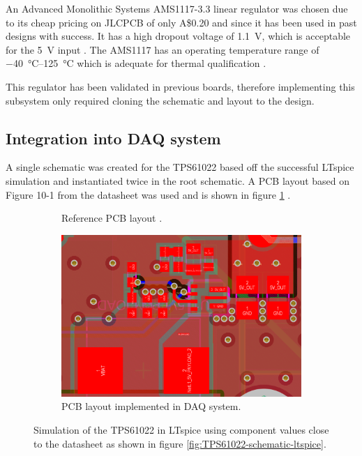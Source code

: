 \documentclass{report}
\newcommand{\aud}{A\$}
\begin{document}
An Advanced Monolithic Systems AMS1117-3.3 linear regulator was chosen due to its cheap pricing on JLCPCB of only \aud 0.20 and since it has been used in past designs with success. It has a high dropout voltage of \SI{1.1}{\volt}, which is acceptable for the \SI{5}{\volt} input \cite{ams2007ams1117}. The AMS1117 has an operating temperature range of \SIrange{-40}{125}{\degreeCelsius} which is adequate for thermal qualification \cite{ams2007ams1117}.

This regulator has been validated in previous boards, therefore implementing this subsystem only required cloning the schematic and layout to the design.

\subsection{Integration into DAQ system}

A single schematic was created for the TPS61022 based off the successful LTspice simulation and instantiated twice in the root schematic. A PCB layout based on Figure 10-1 from the datasheet was used and is shown in figure \ref{fig:TPS61022-layout} \cite{ti2021tps61022}.

\begin{figure}[H]
  \begin{subfigure}{.5\textwidth}
    \centering
    
    \caption{Reference PCB layout \cite{ti2021tps61022}.}
  \end{subfigure}
  \begin{subfigure}{.5\textwidth}
    \centering
    \includegraphics[width=\linewidth]{images/TPS61022-pcb-layout.svg.png}
    \caption{PCB layout implemented in DAQ system.}
  \end{subfigure}
  \caption{Simulation of the TPS61022 in LTspice using component values close to the datasheet as shown in figure \ref{fig:TPS61022-schematic-ltspice}.}
  \label{fig:TPS61022-layout}
\end{figure}
\end{document}
